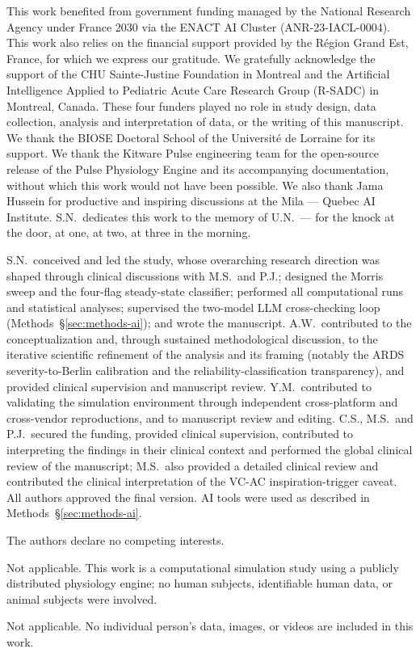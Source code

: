 \documentclass[pdflatex,sn-nature]{sn-jnl}%
\begin{document}
\noindent This work benefited from government funding managed by the National Research Agency under France 2030 via the ENACT AI Cluster (ANR-23-IACL-0004). This work also relies on the financial support provided by the R\'egion Grand Est, France, for which we express our gratitude. We gratefully acknowledge the support of the CHU Sainte-Justine Foundation in Montreal and the Artificial Intelligence Applied to Pediatric Acute Care Research Group (R-SADC) in Montreal, Canada. These four funders played no role in study design, data collection, analysis and interpretation of data, or the writing of this manuscript. We thank the BIOSE Doctoral School of the Universit\'e de Lorraine for its support. We thank the Kitware Pulse engineering team for the open-source release of the Pulse Physiology Engine and its accompanying documentation, without which this work would not have been possible. We also thank Jama Hussein for productive and inspiring discussions at the Mila --- Quebec AI Institute. S.N.\ dedicates this work to the memory of U.N.\ --- for the knock at the door, at one, at two, at three in the morning.



\noindent S.N.\ conceived and led the study, whose overarching research direction was shaped through clinical discussions with M.S.\ and P.J.; designed the Morris sweep and the four-flag steady-state classifier; performed all computational runs and statistical analyses; supervised the two-model LLM cross-checking loop (Methods~\S\ref{sec:methods-ai}); and wrote the manuscript. A.W.\ contributed to the conceptualization and, through sustained methodological discussion, to the iterative scientific refinement of the analysis and its framing (notably the ARDS severity-to-Berlin calibration and the reliability-classification transparency), and provided clinical supervision and manuscript review. Y.M.\ contributed to validating the simulation environment through independent cross-platform and cross-vendor reproductions, and to manuscript review and editing. C.S., M.S.\ and P.J.\ secured the funding, provided clinical supervision, contributed to interpreting the findings in their clinical context and performed the global clinical review of the manuscript; M.S.\ also provided a detailed clinical review and contributed the clinical interpretation of the VC-AC inspiration-trigger caveat. All authors approved the final version. AI tools were used as described in Methods~\S\ref{sec:methods-ai}.


\noindent The authors declare no competing interests.


\noindent Not applicable. This work is a computational simulation study using a publicly distributed physiology engine; no human subjects, identifiable human data, or animal subjects were involved.


\noindent Not applicable. No individual person's data, images, or videos are included in this work.


\end{document}
